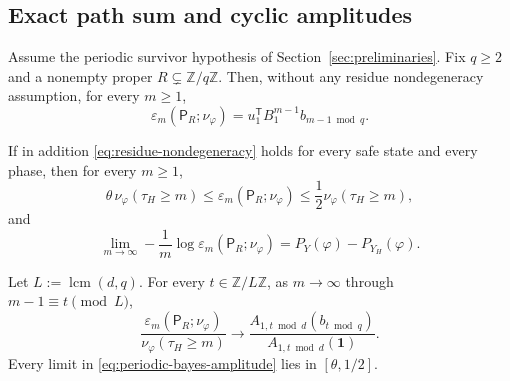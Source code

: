 \subsection{Exact path sum and cyclic amplitudes}

\begin{theorem}
\label{thm:periodic-bayes}
Assume the periodic survivor hypothesis of
Section~\ref{sec:preliminaries}.  Fix \(q\geq2\) and a nonempty proper
\(R\subsetneq\mathbb Z/q\mathbb Z\).  Then, without any residue
nondegeneracy assumption, for every \(m\geq1\),
\begin{equation}
  \varepsilon_m(\mathsf P_R;\nu_\varphi)
  =u_1^{\mathsf T}B_1^{m-1}b_{m-1\bmod q}.
  \label{eq:periodic-bayes-path}
\end{equation}

If in addition \eqref{eq:residue-nondegeneracy} holds for every safe
state and every phase, then for every \(m\geq1\),
\begin{equation}
  \theta\,\nu_\varphi(\tau_H\geq m)
  \leq\varepsilon_m(\mathsf P_R;\nu_\varphi)
  \leq\frac12\nu_\varphi(\tau_H\geq m),
  \label{eq:periodic-bayes-sandwich}
\end{equation}
and
\begin{equation}
  \lim_{m\to\infty}-\frac1m
  \log\varepsilon_m(\mathsf P_R;\nu_\varphi)
  =P_Y(\varphi)-P_{Y_H}(\varphi).
  \label{eq:periodic-bayes-escape}
\end{equation}

Let \(L:=\operatorname{lcm}(d,q)\).  For every
\(t\in\mathbb Z/L\mathbb Z\), as \(m\to\infty\) through
\(m-1\equiv t\pmod L\),
\begin{equation}
  \frac{\varepsilon_m(\mathsf P_R;\nu_\varphi)}
       {\nu_\varphi(\tau_H\geq m)}
  \longrightarrow
  \frac{A_{1,t\bmod d}(b_{t\bmod q})}
       {A_{1,t\bmod d}(\mathbf1)}.
  \label{eq:periodic-bayes-amplitude}
\end{equation}
Every limit in \eqref{eq:periodic-bayes-amplitude} lies in
\([\theta,1/2]\).
\end{theorem}

